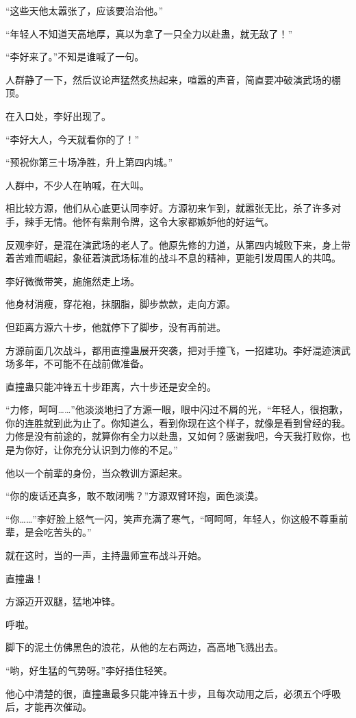 \begin{this_body}
“这些天他太嚣张了，应该要治治他。”

“年轻人不知道天高地厚，真以为拿了一只全力以赴蛊，就无敌了！”

“李好来了。”不知是谁喊了一句。

人群静了一下，然后议论声猛然炙热起来，喧嚣的声音，简直要冲破演武场的棚顶。

在入口处，李好出现了。

“李好大人，今天就看你的了！”

“预祝你第三十场净胜，升上第四内城。”

人群中，不少人在呐喊，在大叫。

相比较方源，他们从心底更认同李好。方源初来乍到，就嚣张无比，杀了许多对手，辣手无情。他怀有紫荆令牌，这令大家都嫉妒他的好运气。

反观李好，是混在演武场的老人了。他原先修的力道，从第四内城败下来，身上带着苦难而崛起，象征着演武场标准的战斗不息的精神，更能引发周围人的共鸣。

李好微微带笑，施施然走上场。

他身材消瘦，穿花袍，抹胭脂，脚步款款，走向方源。

但距离方源六十步，他就停下了脚步，没有再前进。

方源前面几次战斗，都用直撞蛊展开突袭，把对手撞飞，一招建功。李好混迹演武场多年，不可能不在战前做准备。

直撞蛊只能冲锋五十步距离，六十步还是安全的。

“力修，呵呵……”他淡淡地扫了方源一眼，眼中闪过不屑的光，“年轻人，很抱歉，你的连胜就到此为止了。你知道么，看到你现在这个样子，就像是看到曾经的我。力修是没有前途的，就算你有全力以赴蛊，又如何？感谢我吧，今天我打败你，也是为你好，让你充分认识到力修的不足。”

他以一个前辈的身份，当众教训方源起来。

“你的废话还真多，敢不敢闭嘴？”方源双臂环抱，面色淡漠。

“你……”李好脸上怒气一闪，笑声充满了寒气，“呵呵呵，年轻人，你这般不尊重前辈，是会吃苦头的。”

就在这时，当的一声，主持蛊师宣布战斗开始。

直撞蛊！

方源迈开双腿，猛地冲锋。

呼啦。

脚下的泥土仿佛黑色的浪花，从他的左右两边，高高地飞溅出去。

“哟，好生猛的气势呀。”李好捂住轻笑。

他心中清楚的很，直撞蛊最多只能冲锋五十步，且每次动用之后，必须五个呼吸后，才能再次催动。


\end{this_body}
